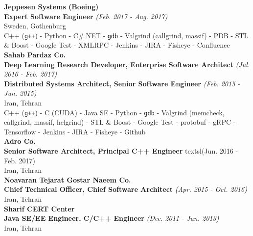 \documentclass[10pt,a4paper]{article}
\begin{document}
\noindent \textbullet \hspace{0.1cm} \large \textbf{Jeppesen Systems (Boeing)} \\
\indent \small \textbf{Expert Software Engineer} \textsl{(Feb. 2017 - Aug. 2017)} \\
\indent \textnormal{Sweden, Gothenburg} \\
C++ (\texttt{g++}) - Python - C\#.NET - \texttt{gdb} - Valgrind (callgrind, massif) - PDB - STL \& Boost - Google Test - XMLRPC - Jenkins - JIRA - Fisheye - Confluence \\

\noindent \textbullet \hspace{0.1cm} \large \textbf{Sahab Pardaz Co.} \\
\indent \small \textbf{Deep Learning Research Developer, Enterprise Software Architect} \textsl{(Jul. 2016 - Feb. 2017)} \\
\indent \small \textbf{Distributed Systems Architect, Senior Software Engineer} \textsl{(Feb. 2015 - Jun. 2015)} \\
\indent \textnormal{Iran, Tehran} \\
C++ (\texttt{g++}) - C (CUDA) - Java SE - Python - \texttt{gdb} - Valgrind (memcheck, callgrind, massif, helgrind) - STL \& Boost - Google Test - protobuf - gRPC - Tensorflow - Jenkins - JIRA - Fisheye - Github \\

\noindent \textbullet \hspace{0.1cm} \large \textbf{Adro Co.} \\
\indent \small \textbf{Senior Software Architect, Principal C++ Engineer} textsl{(Jun. 2016 - Feb. 2017)} \\
\indent \textnormal{Iran, Tehran} \\

\noindent \textbullet \hspace{0.1cm} \large \textbf{Noavaran Tejarat Gostar Naeem Co.} \\
\indent \small \textbf{Chief Technical Officer, Chief Software Architect} \textsl{(Apr. 2015 - Oct. 2016)} \\
\indent \textnormal{Iran, Tehran} \\


\noindent \textbullet \hspace{0.1cm} \large \textbf{Sharif CERT Center} \\ 
\indent \small \textbf{Java SE/EE Engineer, C/C++ Engineer} \textsl{(Dec. 2011 - Jun. 2013)} \\
\textnormal{Iran, Tehran} \\ 
\end{document}
